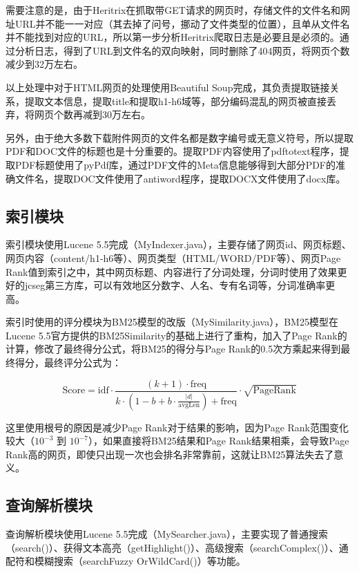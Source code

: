 \documentclass[paper=a4, fontsize=11pt, UTF8]{article} %
\numberwithin{equation}{section} %
\numberwithin{figure}{section} %
\numberwithin{table}{section} %
\begin{document}
需要注意的是，由于Heritrix在抓取带GET请求的网页时，存储文件的文件名和网址URL并不能一一对应（其去掉了问号，挪动了文件类型的位置），且单从文件名并不能找到对应的URL，所以第一步分析Heritrix爬取日志是必要且是必须的。通过分析日志，得到了URL到文件名的双向映射，同时删除了404网页，将网页个数减少到32万左右。

以上处理中对于HTML网页的处理使用Beautiful Soup完成，其负责提取链接关系，提取文本信息，提取title和提取h1-h6域等，部分编码混乱的网页被直接丢弃，将网页个数再减到30万左右。

另外，由于绝大多数下载附件网页的文件名都是数字编号或无意义符号，所以提取PDF和DOC文件的标题也是十分重要的。提取PDF内容使用了pdftotext程序，提取PDF标题使用了pyPdf库，通过PDF文件的Meta信息能够得到大部分PDF的准确文件名，提取DOC文件使用了antiword程序，提取DOCX文件使用了docx库。

\subsection{索引模块}

索引模块使用Lucene 5.5完成（MyIndexer.java），主要存储了网页id、网页标题、网页内容（content/h1-h6等）、网页类型（HTML/WORD/PDF等）、网页Page Rank值到索引之中，其中网页标题、内容进行了分词处理，分词时使用了效果更好的jcseg第三方库，可以有效地区分数字、人名、专有名词等，分词准确率更高。

索引时使用的评分模块为BM25模型的改版（MySimilarity.java），BM25模型在Lucene 5.5官方提供的BM25Similarity的基础上进行了重构，加入了Page Rank的计算，修改了最终得分公式，将BM25的得分与Page Rank的0.5次方乘起来得到最终得分，最终评分公式为：

$$
\mathrm{Score} =  \mathrm{idf} \cdot \dfrac{(k + 1) \cdot \mathrm{freq}}{k \cdot (1 - b + b \cdot \frac{|d|}{\mathrm{avgLen}}) + \mathrm{freq}} \cdot \sqrt{\mathrm{PageRank}}
$$

这里使用根号的原因是减少Page Rank对于结果的影响，因为Page Rank范围变化较大（$10^{-{3}}$ 到 $10^{-{7}}$），如果直接将BM25结果和Page Rank结果相乘，会导致Page Rank高的网页，即使只出现一次也会排名非常靠前，这就让BM25算法失去了意义。

\subsection{查询解析模块}

查询解析模块使用Lucene 5.5完成（MySearcher.java），主要实现了普通搜索（search()）、获得文本高亮（getHighlight()）、高级搜索（searchComplex()）、通配符和模糊搜索（searchFuzzy OrWildCard()）等功能。
\end{document}
